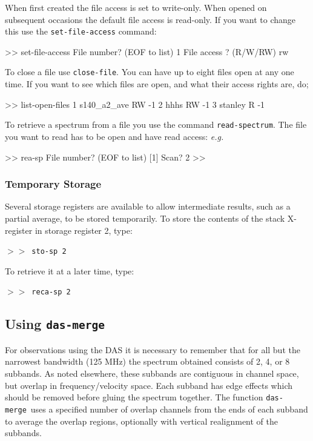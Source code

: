 \documentclass[11pt,twoside]{starlink}
\providecommand{\eg}{\textit{e.g.}}
\providecommand{\dm}{\texttt{das-merge}}
\providecommand{\SP}{{$>\!>$}}
\begin{document}
When first created the file access is set to write-only. When opened on
subsequent occasions the default file access is read-only. If you want to
change this use the \texttt{set-file-access} command:

\begin{terminalv}
>> set-file-access
File number? (EOF to list) 1
File access ? (R/W/RW) rw
\end{terminalv}

To close a file use \texttt{close-file}.  You can have up to eight files open
at any one time.  If you want to see which files are open, and what their
access rights are, do;

\begin{terminalv}
>> list-open-files
1  s140_a2_ave                               RW  -1
2  hhhs                                      RW  -1
3  stanley                                   R   -1
\end{terminalv}

To retrieve a spectrum from a file you use the command \texttt{read-spectrum}.  The file you want to read has to be open and have
read access: \eg

\begin{terminalv}
>> rea-sp
File number? (EOF to list) [1]
Scan? 2
>>
\end{terminalv}

\subsubsection{Temporary Storage}
\label{sec:temp-storage}
Several storage registers are available to allow intermediate results,
such as a partial average, to be stored temporarily. To store the
contents of the stack X-register in storage register 2, type:

\SP\ \texttt{sto-sp 2}

To retrieve it at a later time, type:

\SP\ \texttt{reca-sp 2}


\subsection{Using \texttt{das-merge}}
\label{sec:das-merge}
For observations using the DAS it is necessary to remember that for
all but the narrowest bandwidth (125 MHz) the spectrum obtained
consists of 2, 4, or 8 subbands. As noted elsewhere, these subbands
are contiguous in channel space, but overlap in frequency/velocity
space. Each subband has edge effects which should be removed before
gluing the spectrum together. The function \dm\ uses a specified
number of overlap channels from the ends of each subband to average
the overlap regions, optionally with vertical realignment of the
subbands.
\end{document}
